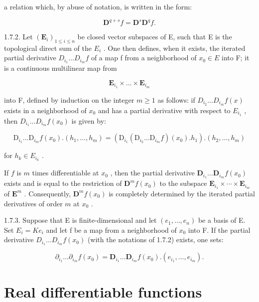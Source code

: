 a relation which, by abuse of notation, is written in the form:

\[
\mathbf {D} ^ {q + s} f = \mathbf {D} ^ {s} \mathbf {D} ^ {q} f.
\]

1.7.2. Let \((\mathbf{E}_{i})_{1\leqslant i\leqslant n}\) be closed vector subspaces of E, such that E is the topological direct sum of the \(E_{i}\) . One then defines, when it exists, the iterated partial derivative \(D_{i_{1}}\ldots D_{i_{m}}f\) of a map f from a neighborhood of \(x_{0}\in E\) into F; it is a continuous multilinear map from

\[
\mathbf {E} _ {i _ {1}} \times \dots \times \mathbf {E} _ {i _ {m}}
\]

into F, defined by induction on the integer \(m \geqslant 1\) as follows: if \(D_{i_{2}} \ldots D_{i_{m}} f(x)\) exists in a neighborhood of \(x_{0}\) and has a partial derivative with respect to \(E_{i_{1}}\) , then \(D_{i_{1}} \ldots D_{i_{m}} f(x_{0})\) is given by:

\[
\mathrm{D} _ {i _ {1}} \dots \mathrm{D} _ {i _ {m}} f (x _ {0}). (h _ {1}, \dots , h _ {m}) = (\mathrm{D} _ {i _ {1}} (\mathrm{D} _ {i _ {2}} \dots \mathrm{D} _ {i _ {m}} f) (x _ {0}). h _ {1}). (h _ {2}, \dots , h _ {m})
\]

for \(h_{k} \in E_{i_{k}}\) .

If \(f\) is \(m\) times differentiable at \(x_{0}\) , then the partial derivative \(\mathbf{D}_{i_{1}}\ldots\mathbf{D}_{i_{m}}f(x_{0})\) exists and is equal to the restriction of \(\mathbf{D}^{m}f(x_{0})\) to the subspace \(\mathbf{E}_{i_{1}}\times\cdots\times\mathbf{E}_{i_{m}}\) of \(\mathbf{E}^{m}\) . Consequently, \(\mathbf{D}^{m}f(x_{0})\) is completely determined by the iterated partial derivatives of order \(m\) at \(x_{0}\) .

1.7.3. Suppose that E is finite-dimensional and let \((e_{1},\ldots,e_{n})\) be a basis of E. Set \(E_{i}=Ke_{i}\) and let f be a map from a neighborhood of \(x_{0}\) into F. If the partial derivative \(D_{i_{1}}\ldots D_{i_{m}}f(x_{0})\) (with the notations of 1.7.2) exists, one sets:

\[
\partial_ {i _ {1}} \dots \partial_ {i _ {m}} f (x _ {0}) = \mathbf {D} _ {i _ {1}} \dots \mathbf {D} _ {i _ {m}} f (x _ {0}). (e _ {i _ {1}}, \dots , e _ {i _ {m}}).
\]

\section{Real differentiable functions}

